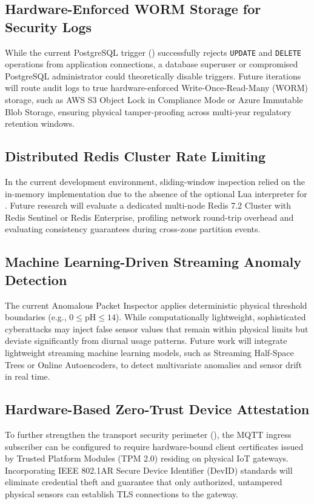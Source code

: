 \documentclass[a4paper]{article}
\begin{document}
\subsection{Hardware-Enforced WORM Storage for Security Logs}
While the current PostgreSQL trigger () successfully rejects \texttt{UPDATE} and \texttt{DELETE} operations from application connections, a database superuser or compromised PostgreSQL administrator could theoretically disable triggers. Future iterations will route audit logs to true hardware-enforced Write-Once-Read-Many (WORM) storage, such as AWS S3 Object Lock in Compliance Mode or Azure Immutable Blob Storage, ensuring physical tamper-proofing across multi-year regulatory retention windows.

\subsection{Distributed Redis Cluster Rate Limiting}
In the current development environment, sliding-window inspection relied on the in-memory  implementation due to the absence of the optional  Lua interpreter for . Future research will evaluate a dedicated multi-node Redis 7.2 Cluster with Redis Sentinel or Redis Enterprise, profiling network round-trip overhead and evaluating consistency guarantees during cross-zone partition events.

\subsection{Machine Learning-Driven Streaming Anomaly Detection}
The current Anomalous Packet Inspector applies deterministic physical threshold boundaries (e.g., $0 \le \text{pH} \le 14$). While computationally lightweight, sophisticated cyberattacks may inject false sensor values that remain within physical limits but deviate significantly from diurnal usage patterns. Future work will integrate lightweight streaming machine learning models, such as Streaming Half-Space Trees or Online Autoencoders, to detect multivariate anomalies and sensor drift in real time.

\subsection{Hardware-Based Zero-Trust Device Attestation}
To further strengthen the transport security perimeter (), the MQTT ingress subscriber can be configured to require hardware-bound client certificates issued by Trusted Platform Modules (TPM 2.0) residing on physical IoT gateways. Incorporating IEEE 802.1AR Secure Device Identifier (DevID) standards will eliminate credential theft and guarantee that only authorized, untampered physical sensors can establish TLS connections to the gateway.
\end{document}
